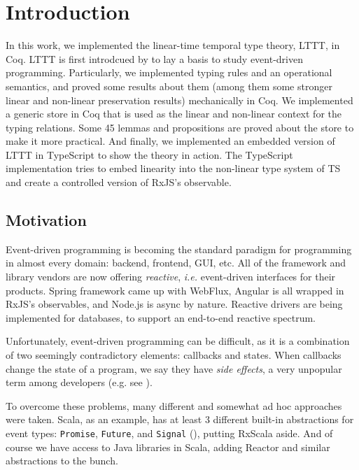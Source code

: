 \chapter{Introduction}\label{chap:introduction}

In this work, we implemented the linear-time temporal type theory, LTTT, in Coq. LTTT is first introdcued by \cite{Paykin2016TheEO} to lay a basis to study event-driven programming. Particularly, we implemented typing rules and an operational semantics, and proved some results about them (among them some stronger linear and non-linear preservation results) mechanically in Coq. We implemented a generic store in Coq that is used as the linear and non-linear context for the typing relations. Some 45 lemmas and propositions are proved about the store to make it more practical. And finally, we implemented an embedded version of LTTT in TypeScript to show the theory in action. The TypeScript implementation tries to embed linearity into the non-linear type system of TS and create a controlled version of RxJS's observable.

\section{Motivation}

Event-driven programming is becoming the standard paradigm for programming in almost every domain: backend, frontend, GUI, etc. All of the framework and library vendors are now offering \textit{reactive}, \textit{i.e.} event-driven interfaces for their products. Spring framework came up with WebFlux, Angular is all wrapped in RxJS's observables, and Node.js is async by nature. Reactive drivers are being implemented for databases, to support an end-to-end reactive spectrum.

Unfortunately, event-driven programming can be difficult, as it is a combination of two seemingly contradictory elements: callbacks and states. When callbacks change the state of a program, we say they have \textit{side effects}, a very unpopular term among developers (e.g. see \cite{aerabi_2020}).

To overcome these problems, many different and somewhat ad hoc approaches were taken. Scala, as an example, has at least 3 different built-in abstractions for event types: \texttt{Promise}, \texttt{Future}, and \texttt{Signal} (\cite{deprecating2010}), putting RxScala aside. And of course we have access to Java libraries in Scala, adding Reactor and similar abstractions to the bunch.

